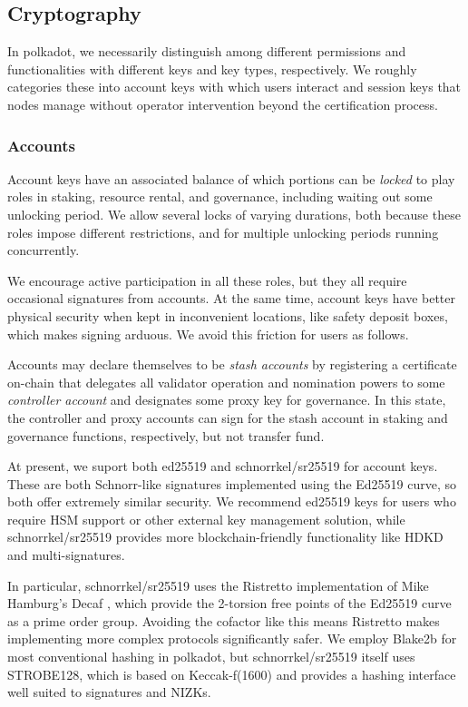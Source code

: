 \subsection{Cryptography}

In polkadot, we necessarily distinguish among different permissions and functionalities with different keys and key types, respectively.  We roughly categories these into account keys with which users interact and session keys that nodes manage without operator intervention beyond the certification process.

\subsubsection{Accounts}

Account keys have an associated balance of which portions can be {\em locked} to play roles in staking, resource rental, and governance, including waiting out some unlocking period.  We allow several locks of varying durations, both because these roles impose different restrictions, and for multiple unlocking periods running concurrently. 

We encourage active participation in all these roles, but they all require occasional signatures from accounts.  At the same time, account keys have better physical security when kept in inconvenient locations, like safety deposit boxes, which makes signing arduous.  We avoid this friction for users as follows.

Accounts may declare themselves to be {\em stash accounts} by registering a certificate on-chain that delegates all validator operation and nomination powers to some {\em controller account} and designates some proxy key for governance.  In this state, the controller and proxy accounts can sign for the stash account in staking and governance functions, respectively, but not transfer fund. 

At present, we suport both ed25519 and schnorrkel/sr25519 for account keys.  These are both Schnorr-like signatures implemented using the Ed25519 curve, so both offer extremely similar security.  We recommend ed25519 keys for users who require HSM support or other external key management solution, while schnorrkel/sr25519 provides more blockchain-friendly functionality like HDKD and multi-signatures.  

In particular, schnorrkel/sr25519 uses the Ristretto implementation \cite{Ristretto} of Mike Hamburg's Decaf \cite[\S7]{Decaf}, which provide the 2-torsion free points of the Ed25519 curve as a prime order group.  Avoiding the cofactor like this means Ristretto makes implementing more complex protocols significantly safer.  We employ Blake2b for most conventional hashing in polkadot, but schnorrkel/sr25519 itself uses STROBE128, which is based on Keccak-f(1600) and provides a hashing interface well suited to signatures and NIZKs.

